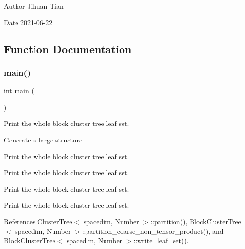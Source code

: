 \begin{DoxyAuthor}{Author}
Jihuan Tian 
\end{DoxyAuthor}
\begin{DoxyDate}{Date}
2021-\/06-\/22 
\end{DoxyDate}


\subsection{Function Documentation}
\mbox{\label{bct-hp-coarse-ntp_8cc_ae66f6b31b5ad750f1fe042a706a4e3d4}} 
\subsubsection{\texorpdfstring{main()}{main()}}
{\footnotesize\ttfamily int main (\begin{DoxyParamCaption}{ }\end{DoxyParamCaption})}

Print the whole block cluster tree leaf set.

Generate a large structure.

Print the whole block cluster tree leaf set.

Print the whole block cluster tree leaf set.

Print the whole block cluster tree leaf set.

Print the whole block cluster tree leaf set.

References Cluster\+Tree$<$ spacedim, Number $>$\+::partition(), Block\+Cluster\+Tree$<$ spacedim, Number $>$\+::partition\+\_\+coarse\+\_\+non\+\_\+tensor\+\_\+product(), and Block\+Cluster\+Tree$<$ spacedim, Number $>$\+::write\+\_\+leaf\+\_\+set().

